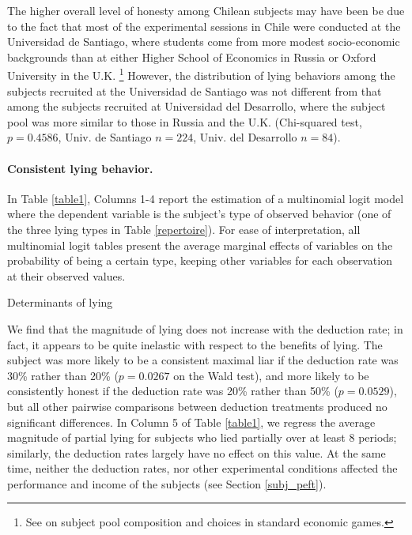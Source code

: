 \documentclass[12pt]{article}
\begin{document}
\par The higher overall level of honesty among Chilean subjects may have been be due to the fact that most of the experimental sessions in Chile were conducted at the Universidad de Santiago, where students come from more modest socio-economic backgrounds than at either Higher School of Economics in Russia or Oxford University in the U.K. \footnote{See \citet{Belotetal2015} on subject pool composition and choices in standard economic games.} However, the distribution of lying behaviors among the subjects recruited at the Universidad de Santiago was not different from that among the subjects recruited at Universidad del Desarrollo, where the subject pool was more similar to those in Russia and the U.K. (Chi-squared test, $p=0.4586$, Univ. de Santiago $n=224$, Univ. del Desarrollo $n=84$). 
\label{stata:chile_udd}

\paragraph{Consistent lying behavior.} In Table \ref{table1}, Columns 1-4 report the estimation of a multinomial logit model where the dependent variable is the subject's type of observed behavior (one of the three lying types in Table \ref{repertoire}). For ease of interpretation, all multinomial logit tables present the average marginal effects of variables on the probability of being a certain type, keeping other variables for each observation at their observed values.  

\begin{table}[ht]
\begin{center}
\tiny

\end{center}
\caption{Determinants of lying}
\label{table1}
\end{table}

\par We find that the magnitude of lying does not increase with the deduction rate; in fact, it appears to be quite inelastic with respect to the benefits of lying. The subject was more likely to be a consistent maximal liar if the deduction rate was 30\% rather than 20\% ($p=0.0267$ on the Wald test), and more likely to be consistently honest if the deduction rate was 20\% rather than 50\% ($p=0.0529$), but all other pairwise comparisons between 
deduction treatments produced no significant differences.\footnotemark{}
In Column 5 of Table \ref{table1}, we regress the average magnitude of partial lying for subjects who lied partially over at least 8 periods; similarly, the deduction rates largely have no effect on this value. At the same time, neither the deduction rates, nor other experimental conditions affected the performance and income of the subjects (see Section \ref{subj_peft}).  
\end{document}
